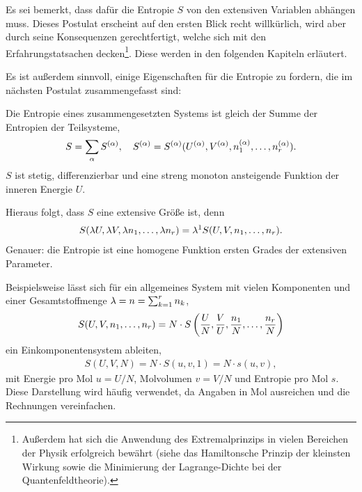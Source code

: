 Es sei bemerkt, dass dafür die Entropie $S$ von den extensiven Variablen abhängen muss. Dieses Postulat erscheint auf den ersten Blick recht willkürlich, wird aber durch seine Konsequenzen gerechtfertigt, welche sich mit den Erfahrungstatsachen decken\footnote{Außerdem hat sich die Anwendung des Extremalprinzips in vielen Bereichen der Physik erfolgreich bewährt (siehe das Hamiltonsche Prinzip der kleinsten Wirkung sowie die Minimierung der Lagrange-Dichte bei der Quantenfeldtheorie).}. Diese werden in den folgenden Kapiteln erläutert.

Es ist außerdem sinnvoll, einige Eigenschaften für die Entropie zu fordern, die im nächsten Postulat zusammengefasst sind:
\begin{postulate}
    \label{post:eigenschaften_entropie}
    Die Entropie eines zusammengesetzten Systems ist gleich der Summe der Entropien der Teilsysteme,
    \begin{align*}
        S =\sum_\alpha S^{(\alpha)}, \quad S^{(\alpha)} = S^{(\alpha)}(U^{(\alpha)},V^{(\alpha)},n_1^{(\alpha)},\ldots, n_r^{(\alpha)}).
    \end{align*}
    $S$ ist stetig, differenzierbar und eine streng monoton ansteigende Funktion der inneren Energie $U$.
\end{postulate}

Hieraus folgt, dass $S$ eine extensive Größe ist, denn
\begin{align*}
    S(\lambda U,\lambda V,\lambda n_1,\ldots, \lambda n_r) = \lambda^1 S(U,V,n_1, \ldots,n_r).
\end{align*}
Genauer: die Entropie ist eine  homogene Funktion ersten Grades der extensiven Parameter.

Beispielsweise lässt sich für ein allgemeines System mit vielen Komponenten und einer Gesamtstoffmenge $\lambda=n=\sum_{k=1}^rn_k$,
\begin{align*}
    S(U,V,n_1, \dots , n_r) = N\cdot S\left(\frac{U}{N},\frac{V}{U},\frac{n_1}{N}, \dots , \frac{n_r}{N}\right)
\end{align*}
ein Einkomponentensystem ableiten,
\begin{align*}
    S(U,V,N) = N\cdot S(u,v,1) = N\cdot s(u,v),
\end{align*}
mit Energie pro Mol $u=U/N$, Molvolumen $v=V/N$ und Entropie pro Mol $s$. Diese Darstellung wird häufig verwendet, da Angaben in Mol ausreichen und die Rechnungen vereinfachen.


